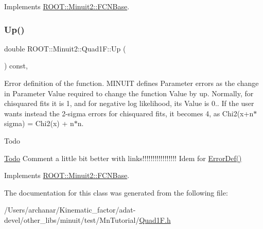 Implements \mbox{\hyperlink{classROOT_1_1Minuit2_1_1FCNBase_a04ef08ddad92ce8d89d498efbe021c39}{R\+O\+O\+T\+::\+Minuit2\+::\+F\+C\+N\+Base}}.

\mbox{\label{classROOT_1_1Minuit2_1_1Quad1F_a14469d6031751fa382120df6327da5ee}} 
\subsubsection{\texorpdfstring{Up()}{Up()}\hspace{0.1cm}{\footnotesize\ttfamily [2/2]}}
{\footnotesize\ttfamily double R\+O\+O\+T\+::\+Minuit2\+::\+Quad1\+F\+::\+Up (\begin{DoxyParamCaption}{ }\end{DoxyParamCaption}) const\hspace{0.3cm}{\ttfamily [inline]}, {\ttfamily [virtual]}}

Error definition of the function. M\+I\+N\+U\+IT defines Parameter errors as the change in Parameter Value required to change the function Value by up. Normally, for chisquared fits it is 1, and for negative log likelihood, its Value is 0.. If the user wants instead the 2-\/sigma errors for chisquared fits, it becomes 4, as Chi2(x+n$\ast$sigma) = Chi2(x) + n$\ast$n.

\begin{DoxyRefDesc}{Todo}
\item[\mbox{\hyperlink{todo__todo000001}{Todo}}]Comment a little bit better with links!!!!!!!!!!!!!!!!! Idem for \mbox{\hyperlink{classROOT_1_1Minuit2_1_1FCNBase_ac4592475c58a65b037ba97ab5f3cba10}{Error\+Def()}}\end{DoxyRefDesc}


Implements \mbox{\hyperlink{classROOT_1_1Minuit2_1_1FCNBase_a04ef08ddad92ce8d89d498efbe021c39}{R\+O\+O\+T\+::\+Minuit2\+::\+F\+C\+N\+Base}}.



The documentation for this class was generated from the following file\+:\begin{DoxyCompactItemize}
\item 
/\+Users/archanar/\+Kinematic\+\_\+factor/adat-\/devel/other\+\_\+libs/minuit/test/\+Mn\+Tutorial/\mbox{\hyperlink{adat-devel_2other__libs_2minuit_2test_2MnTutorial_2Quad1F_8h}{Quad1\+F.\+h}}\end{DoxyCompactItemize}
